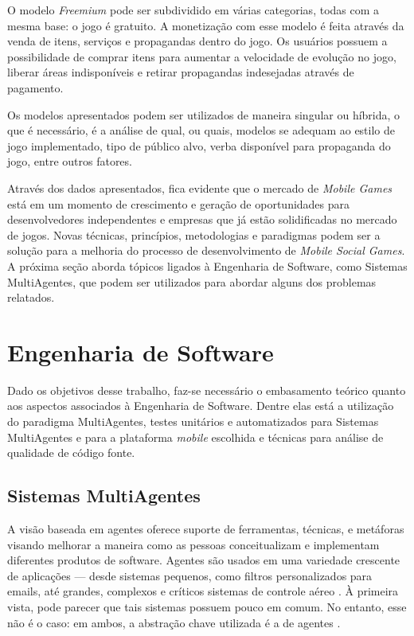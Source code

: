 O modelo \textit{Freemium} pode ser subdividido em várias categorias, todas com
a mesma base: o jogo é gratuito. A monetização com esse modelo é feita através
da venda de itens, serviços e propagandas dentro do jogo. Os usuários possuem a
possibilidade de comprar itens para aumentar a velocidade de evolução no jogo,
liberar áreas indisponíveis e retirar propagandas indesejadas através de
pagamento.

Os modelos apresentados podem ser utilizados de maneira singular ou híbrida, o
que é necessário, é a análise de qual, ou quais, modelos se adequam ao estilo
de jogo implementado, tipo de público alvo, verba disponível para propaganda do
jogo, entre outros fatores.

Através dos dados apresentados, fica evidente que o mercado de \textit{Mobile
Games} está em um momento de crescimento e geração de oportunidades para
desenvolvedores independentes e empresas que já estão solidificadas no mercado
de jogos. Novas técnicas, princípios, metodologias e paradigmas podem ser a
solução para a melhoria do processo de desenvolvimento de \textit{Mobile
Social Games}. A próxima seção aborda tópicos ligados à Engenharia de
Software, como Sistemas MultiAgentes, que podem ser utilizados para abordar
alguns dos problemas relatados.

\section{Engenharia de Software}
\label{sec:refengdesoftware}

Dado os objetivos desse trabalho, faz-se necessário o embasamento teórico
quanto aos aspectos associados à Engenharia de Software. Dentre elas está a
utilização do paradigma MultiAgentes, testes unitários e automatizados para
Sistemas MultiAgentes e para a plataforma \textit{mobile} escolhida e técnicas
para análise de qualidade de código fonte.

  \subsection{Sistemas MultiAgentes}
  \label{sec:refsistemasmultiagentes}

A visão baseada em agentes oferece suporte de ferramentas, técnicas, e
metáforas visando melhorar a maneira como as pessoas conceitualizam e
implementam diferentes produtos de software. Agentes são usados em uma
variedade crescente de aplicações — desde sistemas pequenos, como filtros
personalizados para emails, até grandes, complexos e críticos sistemas de
controle aéreo \cite{jade}. À primeira vista, pode parecer que tais sistemas
possuem pouco em comum. No entanto, esse não é o caso: em ambos, a abstração
chave utilizada é a de agentes \cite{jennings1998}.

